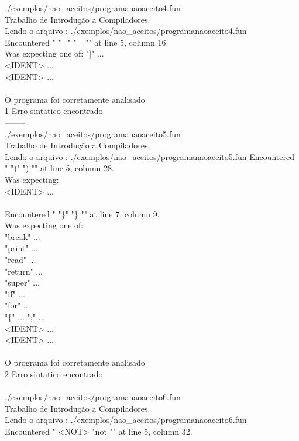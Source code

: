 \documentclass[
	article,			%
	11pt,				%
	oneside,			%
	a4paper,			%
	portuguese,			%
	brazil,				%
	sumario=tradicional
	]{abntex2}
\begin{document}
./exemplos/nao\_aceitos/programanaoaceito4.fun\\
Trabalho de Introdução a Compiladores.\\
Lendo o arquivo : ./exemplos/nao\_aceitos/programanaoaceito4.fun\\
Encountered " "=" "= "" at line 5, column 16.\\
Was expecting one of:
    "]" ...\\
    <IDENT> ...\\
    <IDENT> ...\\
\\
O programa foi corretamente analisado\\
1 Erro sintatico encontrado\\
--------\\
./exemplos/nao\_aceitos/programanaoaceito5.fun\\
Trabalho de Introdução a Compiladores.\\
Lendo o arquivo : ./exemplos/nao\_aceitos/programanaoaceito5.fun
Encountered " ")" ") "" at line 5, column 28.\\
Was expecting:\\
    <IDENT> ...\\
\\
Encountered " "\}" "\} "" at line 7, column 9.\\
Was expecting one of:\\
    "break" ...\\
    "print" ...\\
    "read" ...\\
    "return" ...\\
    "super" ...\\
    "if" ...\\
    "for" ...\\
    "\{" ...
    ";" ...\\
    <IDENT> ...\\
    <IDENT> ...\\
\\
O programa foi corretamente analisado\\
2 Erro sintatico encontrado\\
--------\\
./exemplos/nao\_aceitos/programanaoaceito6.fun\\
Trabalho de Introdução a Compiladores.\\
Lendo o arquivo : ./exemplos/nao\_aceitos/programanaoaceito6.fun\\
Encountered " <NOT> "not "" at line 5, column 32.\\
\end{document}
